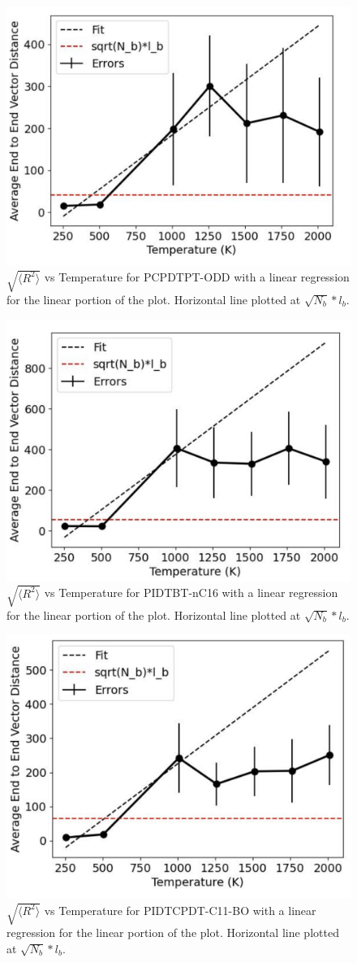 \begin{figure}
    \centering
    \includegraphics[width=0.6\linewidth]{src/figures/pers_l_figs/e-e plots/ODD.png}
    \caption{$\sqrt{\langle R^2 \rangle}$ vs Temperature for PCPDTPT-ODD with a linear regression for the linear portion of the plot. Horizontal line plotted at $\sqrt{N_b}*l_b$.}
    \label{fig:e-e_ODD}
\end{figure}

\begin{figure}
    \centering
    \includegraphics[width=0.6\linewidth]{src/figures/pers_l_figs/e-e plots/PIDT_nC16.png}
    \caption{$\sqrt{\langle R^2 \rangle}$ vs Temperature for PIDTBT-nC16 with a linear regression for the linear portion of the plot. Horizontal line plotted at $\sqrt{N_b}*l_b$.}
    \label{fig:e-e_PIDTBT}
\end{figure}

\begin{figure}
    \centering
    \includegraphics[width=0.6\linewidth]{src/figures/pers_l_figs/e-e plots/PIDT_CPDT.png}
    \caption{$\sqrt{\langle R^2 \rangle}$ vs Temperature for PIDTCPDT-C11-BO with a linear regression for the linear portion of the plot. Horizontal line plotted at $\sqrt{N_b}*l_b$.}
    \label{fig:e-e_PIDTCPDT}
\end{figure}

